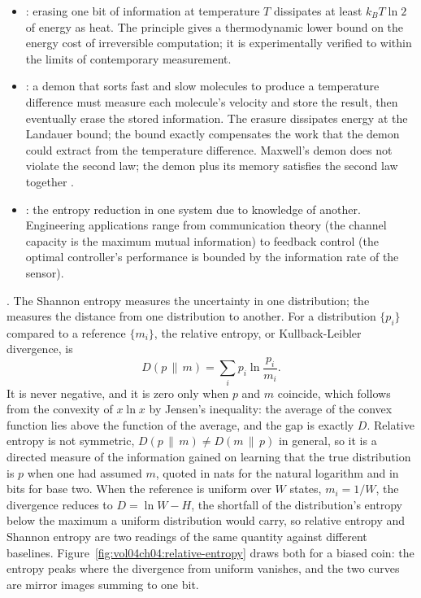 \begin{itemize}[leftmargin=*]
  \item {}: erasing one bit of
    information at temperature $T$ dissipates at least $k_B T \ln 2$
    of energy as heat. The principle gives a thermodynamic lower
    bound on the energy cost of irreversible computation; it is
    experimentally verified to within the limits of contemporary
    measurement.
  \item {}: a demon that sorts fast
    and slow molecules to produce a temperature difference must
    measure each molecule's velocity and store the result, then
    eventually erase the stored information. The erasure dissipates
    energy at the Landauer bound; the bound exactly compensates the
    work that the demon could extract from the temperature
    difference. Maxwell's demon does not violate the second law; the
    demon plus its memory satisfies the second law together
    \cite{paper:shannon1948}.
  \item {}: the entropy reduction in one
    system due to knowledge of another. Engineering applications
    range from communication theory (the channel capacity is the
    maximum mutual information) to feedback control (the optimal
    controller's performance is bounded by the information rate of
    the sensor).
\end{itemize}

. The Shannon
entropy measures the uncertainty in one distribution; the  measures the distance from one distribution to another. For a
distribution $\{p_i\}$ compared to a reference $\{m_i\}$, the relative entropy,
or Kullback-Leibler divergence, is
\[
D(p\,\|\,m) = \sum_i p_i \ln\frac{p_i}{m_i}.
\]
It is never negative, and it is zero only when $p$ and $m$ coincide, which follows
from the convexity of $x\ln x$ by Jensen's inequality: the average of the
convex function lies above the function of the average, and the gap is exactly
$D$. Relative entropy is not symmetric, $D(p\,\|\,m) \ne D(m\,\|\,p)$ in general,
so it is a directed measure of the information gained on learning that the true
distribution is $p$ when one had assumed $m$, quoted in nats for the natural
logarithm and in bits for base two. When the reference is uniform over $W$ states,
$m_i = 1/W$, the divergence reduces to $D = \ln W - H$, the shortfall of the
distribution's entropy below the maximum a uniform distribution would carry, so
relative entropy and Shannon entropy are two readings of the same quantity against
different baselines. Figure~\ref{fig:vol04ch04:relative-entropy} draws both for a
biased coin: the entropy peaks where the divergence from uniform vanishes, and the
two curves are mirror images summing to one bit.

